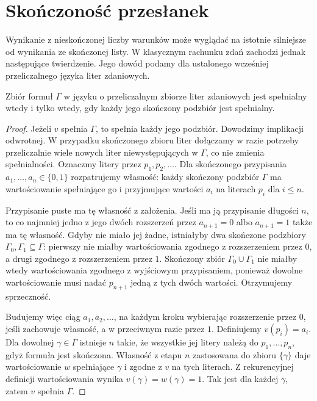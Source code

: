 \section{Skończoność przesłanek}
\label{sec:lst-propositional-compactness}
Wynikanie z nieskończonej liczby warunków może wyglądać na
istotnie silniejsze od wynikania ze skończonej listy.
W klasycznym rachunku zdań zachodzi jednak następujące
twierdzenie. Jego dowód podamy dla ustalonego wcześniej
przeliczalnego języka liter zdaniowych.

\begin{twierdzenie}
\label{thm:lst-propositional-compactness}
Zbiór formuł $\Gamma$ w języku o przeliczalnym zbiorze liter
zdaniowych jest spełnialny wtedy i tylko wtedy,
gdy każdy jego skończony podzbiór jest spełnialny.
\end{twierdzenie}
\begin{proof}
Jeżeli $v$ spełnia $\Gamma$, to spełnia każdy jego podzbiór.
Dowodzimy implikacji odwrotnej.
W przypadku skończonego zbioru liter dołączamy w razie potrzeby
przeliczalnie wiele nowych liter niewystępujących w $\Gamma$,
co nie zmienia spełnialności.
Oznaczmy litery przez $p_1,p_2,\ldots$.
Dla skończonego przypisania $a_1,\ldots,a_n\in\{0,1\}$
rozpatrujemy własność: każdy skończony podzbiór $\Gamma$
ma wartościowanie spełniające go i przyjmujące
wartości $a_i$ na literach $p_i$ dla $i\leq n$.

Przypisanie puste ma tę własność z założenia.
Jeśli ma ją przypisanie długości $n$, to co najmniej jedno
z jego dwóch rozszerzeń przez $a_{n+1}=0$ albo $a_{n+1}=1$
także ma tę własność.
Gdyby nie miało jej żadne, istniałyby dwa skończone podzbiory
$\Gamma_0,\Gamma_1\subseteq\Gamma$: pierwszy nie miałby
wartościowania zgodnego z rozszerzeniem przez $0$,
a drugi zgodnego z rozszerzeniem przez $1$.
Skończony zbiór $\Gamma_0\cup\Gamma_1$ nie miałby wtedy
wartościowania zgodnego z wyjściowym przypisaniem,
ponieważ dowolne wartościowanie musi nadać $p_{n+1}$
jedną z tych dwóch wartości. Otrzymujemy sprzeczność.

Budujemy więc ciąg $a_1,a_2,\ldots$, na każdym kroku
wybierając rozszerzenie przez $0$, jeśli zachowuje własność,
a w przeciwnym razie przez $1$. Definiujemy $v(p_i)=a_i$.
Dla dowolnej $\gamma\in\Gamma$ istnieje $n$ takie, że
wszystkie jej litery należą do $p_1,\ldots,p_n$,
gdyż formuła jest skończona.
Własność z etapu $n$ zastosowana do zbioru $\{\gamma\}$
daje wartościowanie $w$ spełniające $\gamma$ i zgodne
z $v$ na tych literach. Z rekurencyjnej definicji
wartościowania wynika $v(\gamma)=w(\gamma)=1$.
Tak jest dla każdej $\gamma$, zatem $v$ spełnia $\Gamma$.
\end{proof}

